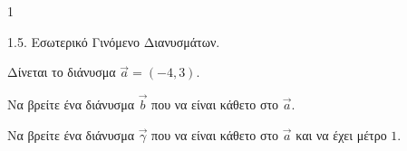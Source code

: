 \begin{ylh}{1}
    \item 1.5. Εσωτερικό Γινόμενο Διανυσμάτων.
\end{ylh}
Δίνεται το διάνυσμα $\vec{a} = (-4, 3)$.
\begin{alist}
\item Να βρείτε ένα διάνυσμα $\vec{b}$ που να είναι κάθετο στο $\vec{a}$. 
\item Να βρείτε ένα διάνυσμα $\vec{\gamma}$ που να είναι κάθετο στο $\vec{a}$ και να έχει μέτρο $1$. 
\end{alist}